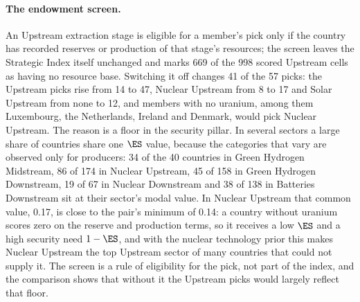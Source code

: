 \paragraph{The endowment screen.} An Upstream extraction stage is eligible for a member's pick
only if the country has recorded reserves or production of that stage's resources; the screen
leaves the Strategic Index itself unchanged and marks 669 of the 998 scored Upstream cells as
having no resource base. Switching it off changes 41 of the 57 picks: the Upstream picks rise
from 14 to 47, Nuclear Upstream from 8 to 17 and Solar Upstream from none to 12, and members
with no uranium, among them Luxembourg, the Netherlands, Ireland and Denmark, would pick Nuclear
Upstream. The reason is a floor in the security pillar. In several sectors a large share of
countries share one $\ES$ value, because the categories that vary are observed only for
producers: 34 of the 40 countries in Green Hydrogen Midstream, 86 of 174 in Nuclear Upstream,
45 of 158 in Green Hydrogen Downstream, 19 of 67 in Nuclear Downstream and 38 of 138 in
Batteries Downstream sit at their sector's modal value. In Nuclear Upstream that common value,
0.17, is close to the pair's minimum of 0.14: a country without uranium scores zero on the
reserve and production terms, so it receives a low $\ES$ and a high security need $1-\ES$, and with the
nuclear technology prior this makes Nuclear Upstream the top Upstream sector of many countries
that could not supply it. The screen is a rule of eligibility for the pick, not part of the index,
and the comparison shows that without it the Upstream picks would largely reflect that floor.



